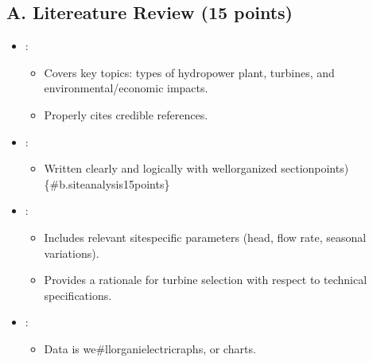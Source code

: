 \documentclass[letterpaper,10pt,english]{jupyterBook}
\begin{document}
\subsection{A. Litereature Review (15 points)}
\label{\detokenize{ProjectSyllabus:a-litereature-review-15-points}}\begin{itemize}
\item {} 
\sphinxAtStartPar
{}:
\begin{itemize}
\item {} 
\sphinxAtStartPar
Covers key topics: types of hydropower plant, turbines, and
environmental/economic impacts.

\item {} 
\sphinxAtStartPar
Properly cites credible references.

\end{itemize}

\item {} 
\sphinxAtStartPar
{}:
\begin{itemize}
\item {} 
\sphinxAtStartPar
Written clearly and logically with well\sphinxhyphen{}organized sectionpoints) \{\#b.\sphinxhyphen{}site\sphinxhyphen{}analysis\sphinxhyphen{}15\sphinxhyphen{}points\}

\end{itemize}

\item {} 
\sphinxAtStartPar
{}:
\begin{itemize}
\item {} 
\sphinxAtStartPar
Includes relevant site\sphinxhyphen{}specific parameters (head, flow rate,
seasonal variations).

\item {} 
\sphinxAtStartPar
Provides a rationale for turbine selection with respect to
technical specifications.

\end{itemize}

\item {} 
\sphinxAtStartPar
{}:
\begin{itemize}
\item {} 
\sphinxAtStartPar
Data is we\#ll\sphinxhyphen{}organielectricraphs, or charts.

\end{itemize}

\end{itemize}
\end{document}
